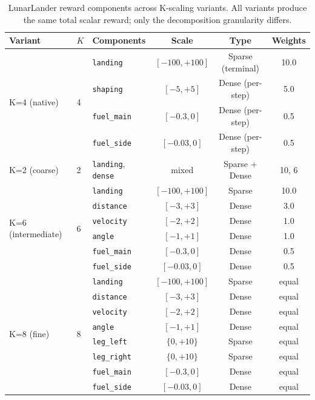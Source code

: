 \documentclass[11pt,a4paper]{article}
\begin{document}
\begin{table}[H]
\centering
\caption{LunarLander reward components across K-scaling variants. All variants produce the same total scalar reward; only the decomposition granularity differs.}
\label{tab:app_lunarlander}
\begin{tabular}{lllccc}
\toprule
Variant & $K$ & Components & Scale & Type & Weights \\
\midrule
\multirow{4}{*}{K=4 (native)} & \multirow{4}{*}{4}
  & \texttt{landing} & $[-100, +100]$ & Sparse (terminal) & 10.0 \\
  & & \texttt{shaping} & $[-5, +5]$ & Dense (per-step) & 5.0 \\
  & & \texttt{fuel\_main} & $[-0.3, 0]$ & Dense (per-step) & 0.5 \\
  & & \texttt{fuel\_side} & $[-0.03, 0]$ & Dense (per-step) & 0.5 \\
\midrule
K=2 (coarse) & 2 & \texttt{landing}, \texttt{dense} & mixed & Sparse + Dense & 10, 6 \\
\midrule
\multirow{6}{*}{K=6 (intermediate)} & \multirow{6}{*}{6}
  & \texttt{landing} & $[-100, +100]$ & Sparse & 10.0 \\
  & & \texttt{distance} & $[-3, +3]$ & Dense & 3.0 \\
  & & \texttt{velocity} & $[-2, +2]$ & Dense & 1.0 \\
  & & \texttt{angle} & $[-1, +1]$ & Dense & 1.0 \\
  & & \texttt{fuel\_main} & $[-0.3, 0]$ & Dense & 0.5 \\
  & & \texttt{fuel\_side} & $[-0.03, 0]$ & Dense & 0.5 \\
\midrule
\multirow{8}{*}{K=8 (fine)} & \multirow{8}{*}{8}
  & \texttt{landing} & $[-100, +100]$ & Sparse & equal \\
  & & \texttt{distance} & $[-3, +3]$ & Dense & equal \\
  & & \texttt{velocity} & $[-2, +2]$ & Dense & equal \\
  & & \texttt{angle} & $[-1, +1]$ & Dense & equal \\
  & & \texttt{leg\_left} & $\{0, +10\}$ & Sparse & equal \\
  & & \texttt{leg\_right} & $\{0, +10\}$ & Sparse & equal \\
  & & \texttt{fuel\_main} & $[-0.3, 0]$ & Dense & equal \\
  & & \texttt{fuel\_side} & $[-0.03, 0]$ & Dense & equal \\
\bottomrule
\end{tabular}
\end{table}
\end{document}
